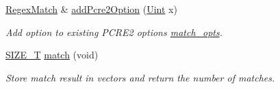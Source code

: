 \begin{DoxyCompactItemize}
\hyperlink{classjpcre2_1_1RegexMatch}{Regex\+Match} \& \hyperlink{classjpcre2_1_1RegexMatch_aac4857cd8f5eae15b29b9afbe9023522}{add\+Pcre2\+Option} (\hyperlink{namespacejpcre2_a078242d38221a13fb3543b9edd78c099}{Uint} x)
\begin{DoxyCompactList}\small\item\em Add option to existing P\+C\+R\+E2 options \hyperlink{classjpcre2_1_1RegexMatch_a697d5731007350b0f20d2018fcfafa90}{match\+\_\+opts}. \end{DoxyCompactList}\item 
\hyperlink{namespacejpcre2_a2aac465ddcb123560c7c8215dd69246c}{S\+I\+Z\+E\+\_\+T} \hyperlink{classjpcre2_1_1RegexMatch_a5868aef3a146594ea1ebef34d122bb33}{match} (void)
\begin{DoxyCompactList}\small\item\em Store match result in vectors and return the number of matches. \end{DoxyCompactList}\end{DoxyCompactItemize}
